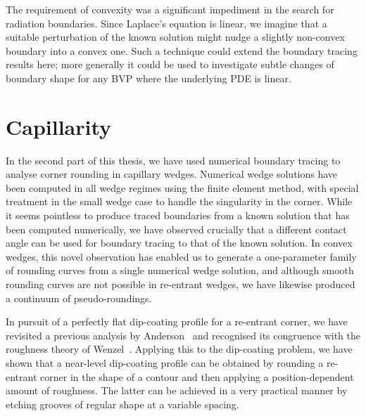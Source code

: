 The requirement of convexity was a significant impediment
in the search for radiation boundaries.
Since Laplace's equation is linear,
we imagine that a suitable perturbation of the known solution
might nudge a slightly non-convex boundary
into a convex one.
Such a technique could extend the boundary tracing results here;
more generally it could be used to investigate
subtle changes of boundary shape
for any BVP where the underlying PDE is linear.

\section{Capillarity}
\label{sec:concluding.capillarity}

In the second part of this thesis,
we have used numerical boundary tracing
to analyse corner rounding in capillary wedges.
Numerical wedge solutions have been computed in all wedge regimes
using the finite element method,
with special treatment in the small wedge case
to handle the singularity in the corner.
While it seems pointless to produce traced boundaries
from a known solution that has been computed numerically,
we have observed crucially that
a different contact angle can be used for boundary tracing
to that of the known solution.
In convex wedges,
this novel observation has enabled us to generate
a one-parameter family of rounding curves
from a single numerical wedge solution,
and although smooth rounding curves
are not possible in re-entrant wedges,
we have likewise produced a continuum of pseudo-roundings.

In pursuit of a perfectly flat dip-coating profile
for a re-entrant corner,
we have revisited a previous analysis
by Anderson~\cite{anderson-2002-thesis-boundary-tracing-pdes}
and recognised its congruence with the roughness theory
of Wenzel~\cite{wenzel-1936-resistance-solid-surfaces-wetting}.
Applying this to the dip-coating problem,
we have shown that
a near-level dip-coating profile can be obtained
by rounding a re-entrant corner in the shape of a contour
and then applying a position-dependent amount of roughness.
The latter can be achieved in a very practical manner
by etching grooves of regular shape at a variable spacing.
